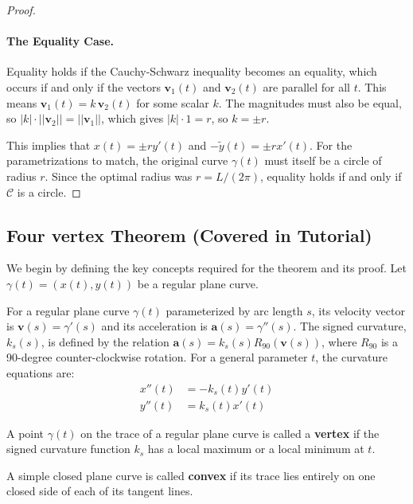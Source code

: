 \documentclass{article}
\begin{document}
\begin{proof}
\paragraph{The Equality Case.}
Equality holds if the Cauchy-Schwarz inequality becomes an equality, which occurs if and only if the vectors $\mathbf{v}_1(t)$ and $\mathbf{v}_2(t)$ are parallel for all $t$. This means $\mathbf{v}_1(t) = k \, \mathbf{v}_2(t)$ for some scalar $k$. The magnitudes must also be equal, so $|k| \cdot ||\mathbf{v}_2|| = ||\mathbf{v}_1||$, which gives $|k| \cdot 1 = r$, so $k = \pm r$.

This implies that $x(t) = \pm r y'(t)$ and $-\tilde{y}(t) = \pm r x'(t)$. For the parametrizations to match, the original curve $\gamma(t)$ must itself be a circle of radius $r$. Since the optimal radius was $r = L/(2\pi)$, equality holds if and only if $\mathcal{C}$ is a circle.
\end{proof}

\subsection{Four vertex Theorem (Covered in Tutorial)}

We begin by defining the key concepts required for the theorem and its proof. Let $\gamma(t) = (x(t), y(t))$ be a regular plane curve.

\begin{definition}
For a regular plane curve $\gamma(t)$ parameterized by arc length $s$, its velocity vector is $\mathbf{v}(s) = \gamma'(s)$ and its acceleration is $\mathbf{a}(s) = \gamma''(s)$. The signed curvature, $k_s(s)$, is defined by the relation $\mathbf{a}(s) = k_s(s) R_{90}(\mathbf{v}(s))$, where $R_{90}$ is a 90-degree counter-clockwise rotation. For a general parameter $t$, the curvature equations are:
\begin{align}
    x''(t) &= -k_s(t)y'(t) \\
    y''(t) &= k_s(t)x'(t)
\end{align}
\end{definition}

\begin{definition}[Vertex]
A point $\gamma(t)$ on the trace of a regular plane curve is called a \textbf{vertex} if the signed curvature function $k_s$ has a local maximum or a local minimum at $t$.
\end{definition}

\begin{definition}
A simple closed plane curve is called \textbf{convex} if its trace lies entirely on one closed side of each of its tangent lines.
\end{definition}
\end{document}

